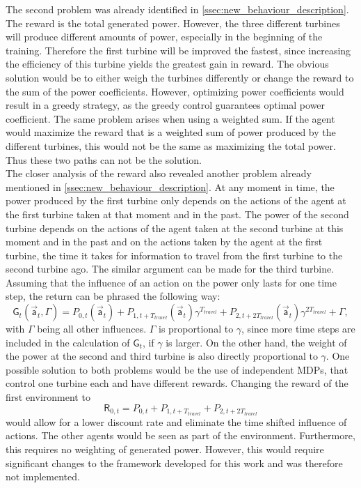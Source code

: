 The second problem was already identified in \autoref{ssec:new_behaviour_description}. The reward is the total generated power. However, the three different turbines will produce different amounts of power, especially in the beginning of the training. Therefore the first turbine will be improved the fastest, since increasing the efficiency of this turbine yields the greatest gain in reward. The obvious solution would be to either weigh the turbines differently or change the reward to the sum of the power coefficients. However, optimizing power coefficients would result in a greedy strategy, as the greedy control guarantees optimal power coefficient. The same problem arises when using a weighted sum. If the agent would maximize the reward that is a weighted sum of power produced by the different turbines, this would not be the same as maximizing the total power. Thus these two paths can not be the solution. \\
The closer analysis of the reward also revealed another problem already mentioned in \autoref{ssec:new_behaviour_description}. At any moment in time, the power produced by the first turbine only depends on the actions of the agent at the first turbine taken at that moment and in the past. The power of the second turbine depends on the actions of the agent taken at the second turbine at this moment and in the past and on the actions taken by the agent at the first turbine, the time it takes for information to travel from the first turbine to the second turbine ago. The similar argument can be made for the third turbine. Assuming that the influence of an action on the power only lasts for one time step, the return can be phrased the following way:
\begin{equation}
\mathsf{G}_t(\vec{\mathsf{a}}_t, \Gamma) = P_{0,t}(\vec{\mathsf{a}}_t) +P_{1,t+T_{travel}}(\vec{\mathsf{a}}_t) \gamma^{T_{travel}} +P_{2,t+2T_{travel}}(\vec{\mathsf{a}}_t)\gamma^{2T_{travel}} + \Gamma,
\end{equation}
with $\Gamma$ being all other influences. $\Gamma$ is proportional to $\gamma$, since more time steps are included in the calculation of $\mathsf{G}_t$, if $\gamma$ is larger. On the other hand, the weight of the power at the second and third turbine is also directly proportional to $\gamma$. One possible solution to both problems would be the use of independent MDPs, that control one turbine each and have different rewards. Changing the reward of the first environment to 
\begin{equation}
	\mathsf{R}_{0,t} = P_{0,t} +P_{1,t+T_{travel}} +P_{2,t+2T_{travel}}
\end{equation}
would allow for a lower discount rate and eliminate the time shifted influence of actions. The other agents would be seen as part of the environment. Furthermore, this requires no weighting of generated power. However, this would require significant changes to the framework developed for this work and was therefore not implemented. \\